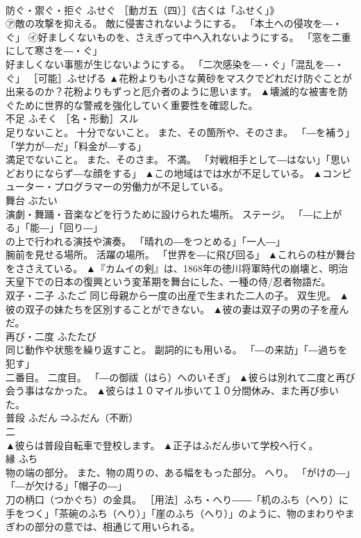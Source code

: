 \documentclass[8pt]{extreport}
\begin{document}
\begin{CJK}{UTF8}{min}
\\	防ぐ・禦ぐ・拒ぐ	ふせぐ	［動ガ五（四）］《古くは「ふせく」》 
\\	㋐敵の攻撃を抑える。 敵に侵害されないようにする。 「本土への侵攻を―・ぐ」 ㋑好ましくないものを、さえぎって中へ入れないようにする。 「窓を二重にして寒さを―・ぐ」 
\\	好ましくない事態が生じないようにする。 「二次感染を―・ぐ」「混乱を―・ぐ」 ［可能］ふせげる	▲花粉よりも小さな黄砂をマスクでどれだけ防ぐことが出来るのか？花粉よりもずっと厄介者のように思います。 ▲壊滅的な被害を防ぐために世界的な警戒を強化していく重要性を確認した。
\\	不足	ふそく	［名・形動］スル 
\\	足りないこと。 十分でないこと。 また、その箇所や、そのさま。 「―を補う」「学力が―だ」「料金が―する」 
\\	満足でないこと。 また、そのさま。 不満。 「対戦相手として―はない」「思いどおりにならず―な顔をする」	▲この地域はでは水が不足している。 ▲コンピューター・プログラマーの労働力が不足している。
\\	舞台	ぶたい	
\\	演劇・舞踊・音楽などを行うために設けられた場所。 ステージ。 「―に上がる」「能―」「回り―」 
\\	の上で行われる演技や演奏。 「晴れの―をつとめる」「一人―」 
\\	腕前を見せる場所。 活躍の場所。 「世界を―に飛び回る」	▲これらの柱が舞台をささえている。 ▲『カムイの剣』は、1868年の徳川将軍時代の崩壊と、明治天皇下での日本の復興という変革期を舞台にした、一種の侍/忍者物語だ。
\\	双子・二子	ふたご	同じ母親から一度の出産で生まれた二人の子。 双生児。	▲彼の双子の妹たちを区別することができない。 ▲彼の妻は双子の男の子を産んだ。
\\	再び・二度	ふたたび	
\\	同じ動作や状態を繰り返すこと。 副詞的にも用いる。 「―の来訪」「―過ちを犯す」 
\\	二番目。 二度目。 「―の御祓（はら）へのいそぎ」	▲彼らは別れて二度と再び会う事はなかった。 ▲彼らは１０マイル歩いて１０分間休み、また再び歩いた。
\\	普段	ふだん	⇒ふだん（不断）
\\	二
\\	▲彼らは普段自転車で登校します。 ▲正子はふだん歩いて学校へ行く。
\\	縁	ふち	
\\	物の端の部分。 また、物の周りの、ある幅をもった部分。 へり。 「がけの―」「―が欠ける」「帽子の―」 
\\	刀の柄口（つかぐち）の金具。 ［用法］ふち・へり――「机のふち（へり）に手をつく」「茶碗のふち（へり）」「崖のふち（へり）」のように、物のまわりやまぎわの部分の意では、相通じて用いられる。 

\end{CJK}
\end{document}
